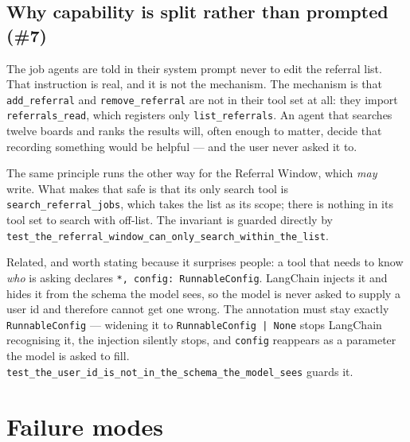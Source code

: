 \documentclass[11pt,a4paper]{article}
\begin{document}
\subsection{Why capability is split rather than prompted (\#7)}

The job agents are told in their system prompt never to edit the referral list. That
instruction is real, and it is not the mechanism. The mechanism is that
\texttt{add\_\allowbreak{}referral} and \texttt{remove\_\allowbreak{}referral} are not in their tool set at all: they
import \texttt{referrals\_\allowbreak{}read}, which registers only \texttt{list\_\allowbreak{}referrals}. An agent that
searches twelve boards and ranks the results will, often enough to matter, decide that
recording something would be helpful --- and the user never asked it to.

The same principle runs the other way for the Referral Window, which \emph{may} write. What
makes that safe is that its only search tool is \texttt{search\_\allowbreak{}referral\_\allowbreak{}jobs}, which takes
the list as its scope; there is nothing in its tool set to search with off-list. The
invariant is guarded directly by
\texttt{test\_\allowbreak{}the\_\allowbreak{}referral\_\allowbreak{}window\_\allowbreak{}can\_\allowbreak{}only\_\allowbreak{}search\_\allowbreak{}within\_\allowbreak{}the\_\allowbreak{}list}.

Related, and worth stating because it surprises people: a tool that needs to know \emph{who}
is asking declares \texttt{*, config: RunnableConfig}. LangChain injects it and hides it from
the schema the model sees, so the model is never asked to supply a user id and therefore
cannot get one wrong. The annotation must stay exactly \texttt{RunnableConfig} --- widening
it to \texttt{RunnableConfig | None} stops LangChain recognising it, the injection silently
stops, and \texttt{config} reappears as a parameter the model is asked to fill.
\texttt{test\_\allowbreak{}the\_\allowbreak{}user\_\allowbreak{}id\_\allowbreak{}is\_\allowbreak{}not\_\allowbreak{}in\_\allowbreak{}the\_\allowbreak{}schema\_\allowbreak{}the\_\allowbreak{}model\_\allowbreak{}sees} guards it.

\section{Failure modes}
\label{sec:failure}
\end{document}
